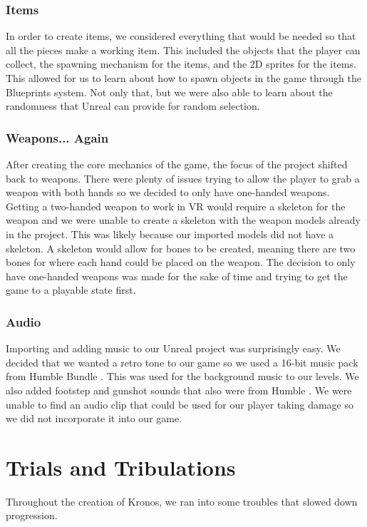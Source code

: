 \documentclass{sigchi}
\begin{document}
\subsubsection*{Items} In order to create items, we considered everything that would be needed so that all the pieces make a working item. This included the objects that the player can collect, the spawning mechanism for the items, and the 2D sprites for the items. This allowed for us to learn about how to spawn objects in the game through the Blueprints system. Not only that, but we were also able to learn about the randomness that Unreal can provide for random selection.

\subsubsection*{Weapons... Again}
After creating the core mechanics of the game, the focus of the project shifted back to weapons. There were plenty of issues trying to allow the player to grab a weapon with both hands so we decided to only have one-handed weapons. Getting a two-handed weapon to work in VR would require a skeleton for the weapon and we were unable to create a skeleton with the weapon models already in the project. This was likely because our imported models did not have a skeleton. A skeleton would allow for bones to be created, meaning there are two bones for where each hand could be placed on the weapon. The decision to only have one-handed weapons was made for the sake of time and trying to get the game to a playable state first.

\subsubsection*{Audio}
Importing and adding music to our Unreal project was surprisingly easy. We decided that we wanted a retro tone to our game so we used a 16-bit music pack from Humble Bundle \cite{humble}. This was used for the background music to our levels. We also added footstep and gunshot sounds that also were from Humble \cite{humble}. We were unable to find an audio clip that could be used for our player taking damage so we did not incorporate it into our game. 

\section{Trials and Tribulations}
Throughout the creation of Kronos, we ran into some troubles that slowed down progression. 
\end{document}
